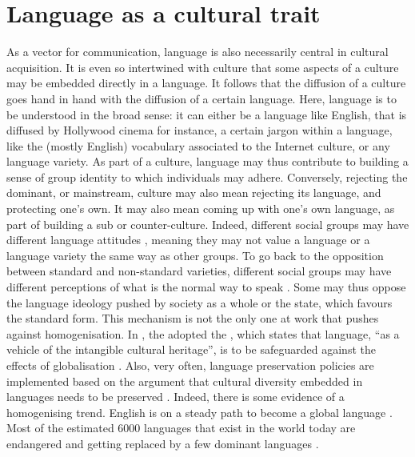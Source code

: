 \documentclass[../thesis.tex]{subfiles}
\begin{document}
\section{Language as a cultural trait}
\label{sec:lang_as_cultural_trait}
As a vector for communication, language is also necessarily central in cultural
acquisition. It is even so intertwined with culture that some aspects of a culture may
be embedded directly in a language. It follows that the diffusion of a culture goes hand
in hand with the diffusion of a certain language. Here, language is to be understood in
the broad sense: it can either be a language like English, that is diffused by Hollywood
cinema for instance, a certain jargon within a language, like the (mostly English)
vocabulary associated to the Internet culture, or any language variety. As part of a
culture, language may thus contribute to building a sense of group identity to which
individuals may adhere. Conversely, rejecting the dominant, or mainstream, culture may
also mean rejecting its language, and protecting one's own. It may also mean coming up
with one's own language, as part of building a sub or counter-culture. Indeed, different
social groups may have different language attitudes \cite{GarrettLanguageAttitudes2006},
meaning they may not value a language or a language variety the same way as other
groups. To go back to the opposition between standard and non-standard varieties,
different social groups may have different perceptions of what is the normal way to
speak \cite{KretzschmarLanguageVariation2010}. Some may thus oppose the language
ideology pushed by society as a whole or the state, which favours the standard form.
This mechanism
is not the only one at work that pushes against homogenisation. In
\citeyear{UNESCOConventionSafeguarding2003}, the
\citeauthor{UNESCOConventionSafeguarding2003} adopted the
, which states that language, ``as a vehicle
of the intangible cultural heritage'', is to be safeguarded against the effects of
globalisation \cite{UNESCOConventionSafeguarding2003}. Also, very often, language
preservation policies are implemented based on the argument that cultural diversity
embedded in languages needs to be preserved
\cite{CrystalLanguageDeath2000,GrenobleEndangeredLanguages1998,KraussWorldLanguages1992}.
Indeed, there is some evidence of a homogenising trend. English is on a steady path to
become a global language \cite{CrystalEnglishGlobal2010}. Most of the estimated
\SI{6000}{} languages that exist in the world today are endangered
\cite{CrystalLanguageDeath2000,GrenobleEndangeredLanguages1998,KraussWorldLanguages1992}
and getting replaced by a few dominant languages
\cite{GrilloDominantLanguages1989,WardhaughLanguagesCompetition1987}.
\end{document}
